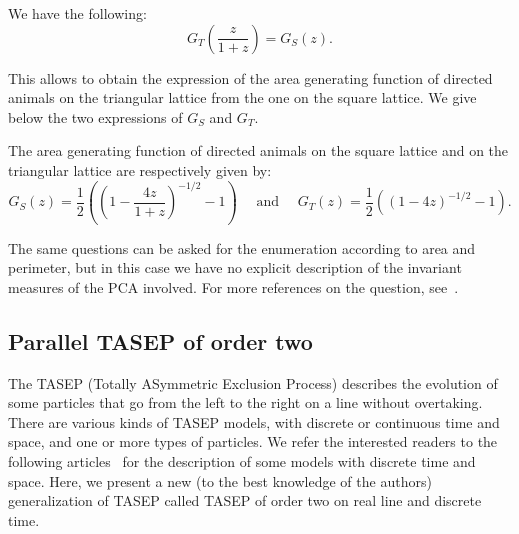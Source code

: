 \documentclass[AHL,Unicode,longabstracts]{cedram}
\newcounter{a}
\begin{document}
\begin{lemm}\label{lem:eq}
We have the following:
\begin{equation}\label{eq:eq}
G_T\left(\frac{z}{1+z}\right) = G_S(z).
\end{equation}
\end{lemm}

This allows to obtain the expression of the area generating function of directed animals on the triangular lattice from the one on the square lattice. We give below the two expressions of $G_S$ and $G_T$.

\begin{theo}
The area generating function of directed animals on the square lattice and on the triangular lattice are respectively given by:
\begin{equation*}
G_S(z) = \frac{1}{2} \left(\left(1 - \frac{4z}{1+z} \right)^{-1/2} - 1 \right) \quad \text{ and } \quad G_T(z) = \frac{1}{2} \left(\left(1 - 4z \right)^{-1/2} - 1 \right).
\end{equation*}
\end{theo}

The same questions can be asked for the enumeration according to area and perimeter, but in this case we have no explicit description of the invariant measures of the PCA involved. For more references on the question, see~\cite{LBM07,mm_tcs}.

\subsection{Parallel TASEP of order two} \label{sec:TASEP}

The TASEP (Totally ASymmetric Exclusion Process) describes the evolution of some particles that go from the left to the right on a line without overtaking. There are various kinds of TASEP models, with discrete or continuous time and space, and one or more types of particles. We refer the interested readers to the following articles~\cite{BC15,belitsky,gray} for the description of some models with discrete time and space. Here, we present a new (to the best knowledge of the authors) generalization of TASEP called TASEP of order two on real line and discrete time.
\end{document}
